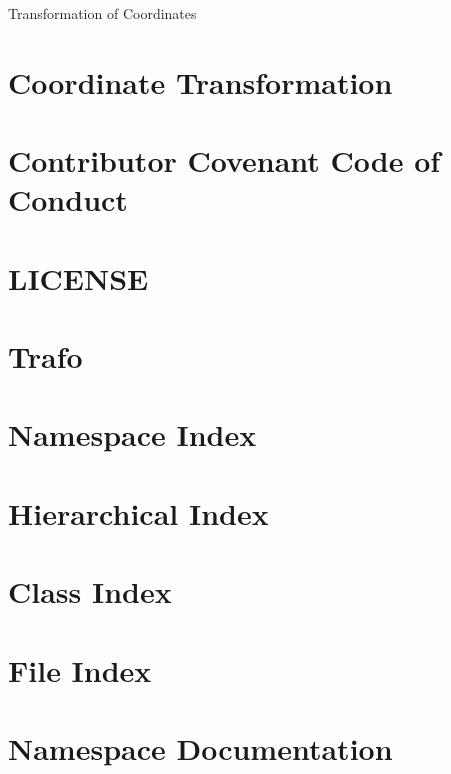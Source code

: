 Transformation of Coordinates
\chapter{Coordinate Transformation}
\label{index}\hypertarget{index}{}
\chapter{Contributor Covenant Code of Conduct}
\label{md__c_o_d_e__o_f__c_o_n_d_u_c_t}

\chapter{L\+I\+C\+E\+N\+SE}
\label{md__l_i_c_e_n_s_e}

\chapter{Trafo}
\label{md__r_e_a_d_m_e}

\chapter{Namespace Index}

\chapter{Hierarchical Index}

\chapter{Class Index}

\chapter{File Index}

\chapter{Namespace Documentation}







